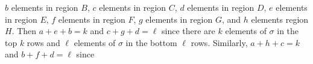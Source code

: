 \documentclass[
final,nomarks
]{dmtcs-episciences}
\begin{document}
\begin{math}b\end{math} elements in region \begin{math}B\end{math}, \begin{math}c\end{math} elements in region \begin{math}C\end{math}, \begin{math}d\end{math} elements in region \begin{math}D\end{math}, 
\begin{math}e\end{math} elements in region \begin{math}E\end{math}, \begin{math}f\end{math} elements in region \begin{math}F\end{math}, \begin{math}g\end{math} elements in region \begin{math}G\end{math}, and \begin{math}h\end{math} elements 
region \begin{math}H\end{math}.
Then \begin{math}a+e+b =k\end{math}  and \begin{math}c+g+d = \ell\end{math} since there are \begin{math}k\end{math} elements of \begin{math}\sigma\end{math} in the top \begin{math}k\end{math} rows and \begin{math}\ell\end{math} elements of \begin{math}\sigma\end{math} in the bottom \begin{math}\ell\end{math} rows. Similarly, \begin{math}a+h+c = k\end{math} and \begin{math}b+f+d =\ell\end{math} since 
\end{document}
